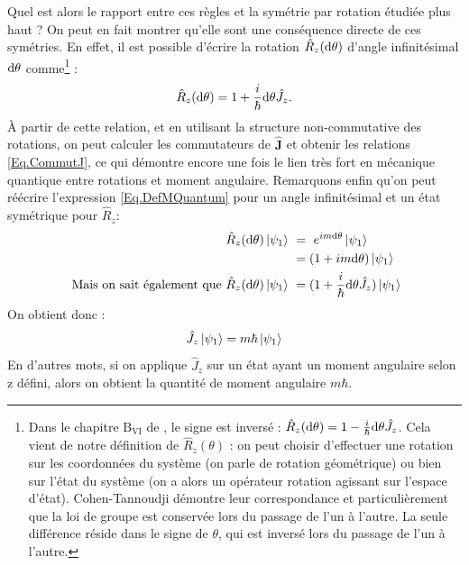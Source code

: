 Quel est alors le rapport entre ces règles et la symétrie par rotation étudiée plus haut ? On peut en fait montrer qu'elle sont une conséquence directe de ces symétries. En effet, il est possible d'écrire la rotation $\hat{R}_z(\mathrm{d}\theta)$ d'angle infinitésimal $\mathrm{d}\theta$ comme\footnote{Dans le chapitre $\text{B}_{\text{VI}}$ de , le signe est inversé : $\hat{R}_z(\mathrm{d}\theta) = 1-\frac{i}{\hbar}\mathrm{d} \theta \hat{J}_z$. Cela vient de notre définition de $\hat{R}_z(\theta)$ : on peut choisir d'effectuer une rotation sur les coordonnées du système (on parle de rotation géométrique) ou bien sur l'état du système (on a alors un opérateur rotation agissant sur l'espace d'état). Cohen-Tannoudji démontre leur correspondance et particulièrement que la loi de groupe est conservée lors du passage de l'un à l'autre. La seule différence réside dans le signe de $\theta$, qui est inversé lors du passage de l'un à l'autre.} :
\begin{equation*}
\hat{R}_z(\mathrm{d}\theta) = 1+\frac{i}{\hbar}\mathrm{d} \theta \hat{J}_z.
\end{equation*}
\`A partir de cette relation, et en utilisant la structure non-commutative des rotations, on peut calculer les commutateurs de $\bm{\hat{J}}$ et obtenir les relations \ref{Eq.CommutJ}, ce qui démontre encore une fois le lien très fort en mécanique quantique entre rotations et moment angulaire. Remarquons enfin qu'on peut réécrire l'expression \ref{Eq.DefMQuantum} pour un angle infinitésimal et un état symétrique pour $\hat{R}_z$:
\begin{align*}
\hat{R}_z(\mathrm{d}\theta)\ket{\psi_1}~&=~e^{im\mathrm{d}\theta}\ket{\psi_1}\\
~&=(1+im\mathrm{d}\theta)\ket{\psi_1}\\
\mbox{ Mais on sait également que }\hat{R}_z(\mathrm{d}\theta)\ket{\psi_1}~&=(1+\frac{i}{\hbar}\mathrm{d} \theta \hat{J}_z)\ket{\psi_1}
\end{align*}
On obtient donc : 
\begin{equation*}
\hat{J}_z\ket{\psi_1} = m\hbar\ket{\psi_1}
\end{equation*}
En d'autres mots, si on applique $\hat{J}_z$ sur un état ayant un moment angulaire selon z défini, alors on obtient la quantité de moment angulaire $m\hbar$. 

